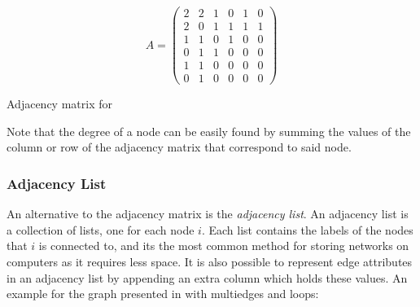 \begin{table}[H]
  \begin{equation*}
    A = 
   \begin{pmatrix}
      2 & 2 & 1 & 0 & 1 & 0 \\
      2 & 0 & 1 & 1 & 1 & 1 \\
      1 & 1 & 0 & 1 & 0 & 0 \\
      0 & 1 & 1 & 0 & 0 & 0 \\
      1 & 1 & 0 & 0 & 0 & 0 \\
      0 & 1 & 0 & 0 & 0 & 0 
    \end{pmatrix}
  \end{equation*}
  \caption{Adjacency matrix for  }
\end{table}

\begin{remark}
  Note that the degree of a node can be easily found by summing the values of
  the column or row of the adjacency matrix that correspond to said node.
\end{remark}
\subsubsection{Adjacency List}
  An alternative to the adjacency matrix is the \textit{adjacency
list}. An adjacency list is a collection of lists, one for each node
$i$. Each list contains the labels of the nodes that $i$ is connected
to, and its the most common method for storing networks on computers
as it requires less space. It is also possible to represent edge
attributes in an adjacency list by appending an extra column which
holds these values. An example for the graph presented in
 with multiedges and loops:

